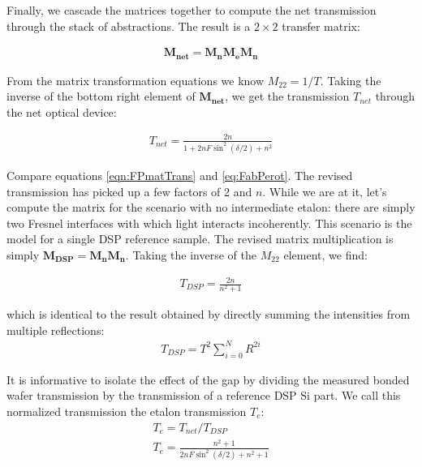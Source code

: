 \documentclass[osajnl,preprint,showpacs,superscriptaddress,12pt]{revtex4-1} %
\begin{document}
Finally, we cascade the matrices together to compute the net transmission through the stack of abstractions.  The result is a $2\times2$ transfer matrix: 

\begin{eqnarray}
\boldsymbol{M_{net}}=\boldsymbol{M_n}\boldsymbol{M_e}\boldsymbol{M_n}
\end{eqnarray}

From the matrix transformation equations \cite{2007fuph.book.....S} we know $M_{22}=1/T$.  Taking the inverse of the bottom right element of $\boldsymbol{M_{net}}$, we get the transmission $T_{net}$ through the net optical device: 

\begin{eqnarray}
T_{net}=\frac{2 n}{1+ 2n F\sin ^2(\delta/2)+n^2} \label{eqn:FPmatTrans}
\end{eqnarray}

Compare equations \ref{eqn:FPmatTrans} and \ref{eq:FabPerot}.  The revised transmission has picked up a few factors of 2 and $n$.  While we are at it, let's compute the matrix for the scenario with no intermediate etalon: there are simply two Fresnel interfaces with which light interacts incoherently.  This scenario is the model for a single DSP reference sample. The revised matrix multiplication is simply $\boldsymbol{M_{DSP}}=\boldsymbol{M_n}\boldsymbol{M_n}$.  Taking the inverse of the $M_{22}$ element, we find: 

\begin{eqnarray}
T_{DSP}=\frac{2 n}{n^2+1}\label{eqn:EqofSummedSlab}
\end{eqnarray}

which is identical to the result obtained by directly summing the intensities from multiple reflections:
\begin{eqnarray}
T_{DSP}=T^2 \sum_{i=0}^{N}R^{2i} \label{eqn:multsum}
\end{eqnarray}

It is informative to isolate the effect of the gap by dividing the measured bonded wafer transmission by the transmission of a reference DSP Si part.  We call this normalized transmission the etalon transmission $T_{e}$:
\begin{eqnarray}
T_{e} = T_{net}/T_{DSP} \\
T_{e} = \frac{n^2+1}{2 n F \sin ^2(\delta/2)+n^2+1} \label{eqn:Tetalon}
\end{eqnarray}








\end{document}
